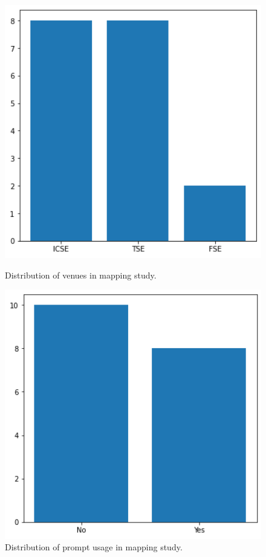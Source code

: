 \documentclass[a4paper]{article}
\begin{document}
\begin{figure}[h]
	\hfill
	\begin{minipage}{0.45\textwidth}
		\includegraphics[width=1\textwidth]{figures/Venues.png}
		\caption{Distribution of venues in mapping study.}
		\label{fig:Venues}
	\end{minipage}
	\hfill
	\begin{minipage}{0.45\textwidth}
		\includegraphics[width=1\textwidth]{figures/Prompts.png}
		\caption{Distribution of prompt usage in mapping study.}
		\label{fig:Prompts}
	\end{minipage}
	\hfill
\end{figure}
\end{document}
